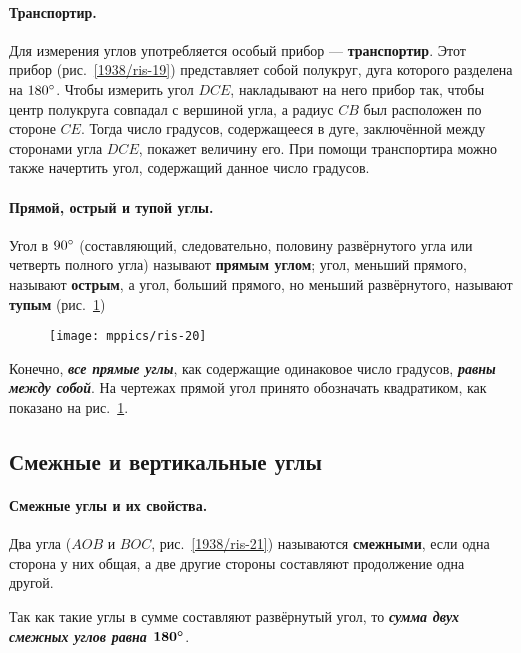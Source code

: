 \paragraph{Транспортир.}\label{1938/20}
Для измерения углов употребляется особый прибор — \textbf{транспортир}.
Этот прибор (рис.~\ref{1938/ris-19}) представляет собой полукруг, дуга которого разделена на $180\degree $.
Чтобы измерить угол $DCE$, накладывают на него прибор так, чтобы центр полукруга совпадал с вершиной угла, а радиус $CB$ был расположен по стороне $CE$.
Тогда число градусов, содержащееся в дуге, заключённой между сторонами угла $DCE$, покажет величину его.
При помощи транспортира можно также начертить угол, содержащий данное число градусов.

\paragraph{Прямой, острый и тупой углы.}\label{1938/21}
Угол в $90\degree$ (составляющий, следовательно, половину развёрнутого угла или четверть полного угла) называют \textbf{прямым углом};
угол, меньший прямого, называют \textbf{острым}, а угол, больший прямого, но меньший развёрнутого, называют \textbf{тупым} (рис.~\ref{1938/ris-20})

\begin{figure}[h!]
\centering
\texttt{[image: mppics/ris-20]}
\caption{}\label{1938/ris-20}
\end{figure}

Конечно, \textbf{\emph{все прямые углы}}, как содержащие одинаковое число градусов, \textbf{\emph{равны между собой}}.
На чертежах прямой угол принято обозначать квадратиком, как показано на рис.~\ref{1938/ris-20}.

\subsection*{Смежные и вертикальные углы}



\paragraph{Смежные углы и их свойства.}\label{1938/22}
Два угла ($AOB$ и $BOC$, рис.~\ref{1938/ris-21}) называются \textbf{смежными}, если одна сторона у них общая, а две другие стороны составляют продолжение одна другой.

Так как такие углы в сумме составляют развёрнутый угол, то \textbf{\emph{сумма двух смежных углов равна $\bm{180\degree}$}}.

